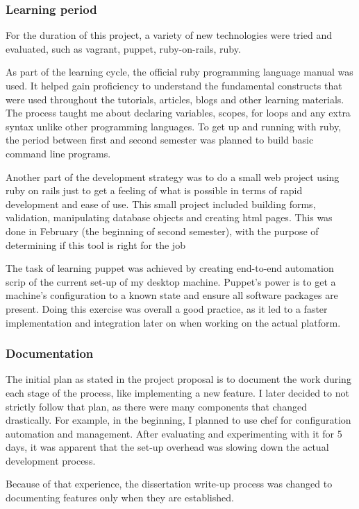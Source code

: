 \documentclass{article}
\begin{document}
\subsubsection{Learning period}
For the duration of this project, a variety of new technologies were tried and evaluated, such as \gls{vagrant}, \gls{puppet}, \gls{ruby-on-rails}, \gls{ruby}.

As part of the learning cycle, the official ruby programming language manual was used. It helped gain proficiency to understand the fundamental constructs that were used throughout the tutorials, articles, blogs and other learning materials. The process taught me about declaring variables, scopes, for loops and any extra syntax unlike other programming languages. To get up and running with \gls{ruby}, the period between first and second semester was planned to build basic command line programs.

Another part of the development strategy was to do a small web project using ruby on rails just to get a feeling of what is possible in terms of rapid development and ease of use. This small project included building forms, validation, manipulating database objects and creating \gls{html} pages. This was done in February (the beginning of second semester), with the purpose of determining if this tool is right for the job

The task of learning \gls{puppet} was achieved by creating end-to-end automation scrip of the current set-up of my desktop machine. Puppet's power is to get a machine's configuration to a known state and ensure all software packages are present. Doing this exercise was overall a good practice, as it led to a faster implementation and integration later on when working on the actual platform.

\subsubsection{Documentation}
The initial plan as stated in the project proposal is to document the work during each stage of the process, like implementing a new feature. I later decided to not strictly follow that plan, as there were many components that changed drastically. For example, in the beginning, I planned to use chef for configuration automation and management. After evaluating and experimenting with it for 5 days, it was apparent that the set-up overhead was slowing down the actual development process. 

Because of that experience, the dissertation write-up process was changed to documenting features only when they are established.
\end{document}
